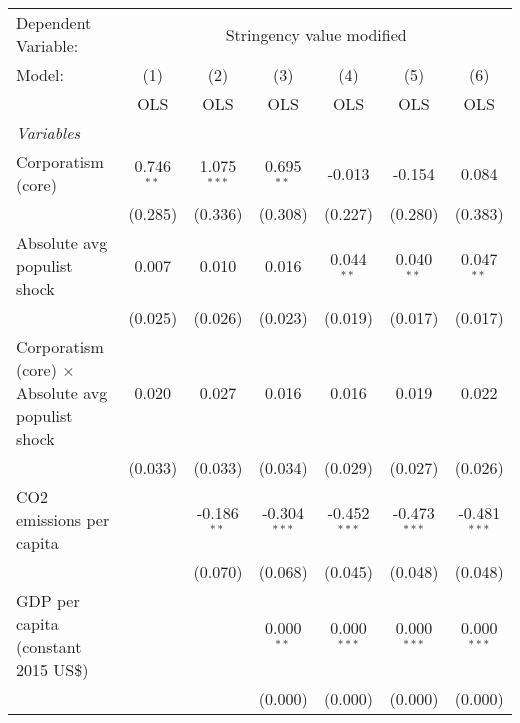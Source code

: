 
\begingroup
\centering
\begin{tabular}{lcccccc}
   \toprule
   Dependent Variable: & \multicolumn{6}{c}{Stringency value modified}\\
   Model:                                                   & (1)          & (2)           & (3)            & (4)            & (5)            & (6)\\  
                                                            &  OLS         & OLS           & OLS            & OLS            & OLS            & OLS\\  
   \midrule
   \emph{Variables}\\
   Corporatism (core)                                       & 0.746$^{**}$ & 1.075$^{***}$ & 0.695$^{**}$   & -0.013         & -0.154         & 0.084\\   
                                                            & (0.285)      & (0.336)       & (0.308)        & (0.227)        & (0.280)        & (0.383)\\   
   Absolute avg populist shock                              & 0.007        & 0.010         & 0.016          & 0.044$^{**}$   & 0.040$^{**}$   & 0.047$^{**}$\\   
                                                            & (0.025)      & (0.026)       & (0.023)        & (0.019)        & (0.017)        & (0.017)\\   
   Corporatism (core) $\times$ Absolute avg populist shock  & 0.020        & 0.027         & 0.016          & 0.016          & 0.019          & 0.022\\   
                                                            & (0.033)      & (0.033)       & (0.034)        & (0.029)        & (0.027)        & (0.026)\\   
   CO2 emissions per capita                                 &              & -0.186$^{**}$ & -0.304$^{***}$ & -0.452$^{***}$ & -0.473$^{***}$ & -0.481$^{***}$\\   
                                                            &              & (0.070)       & (0.068)        & (0.045)        & (0.048)        & (0.048)\\   
   GDP per capita (constant 2015 US\$)                      &              &               & 0.000$^{**}$   & 0.000$^{***}$  & 0.000$^{***}$  & 0.000$^{***}$\\   
                                                            &              &               & (0.000)        & (0.000)        & (0.000)        & (0.000)\\   

\end{tabular}
